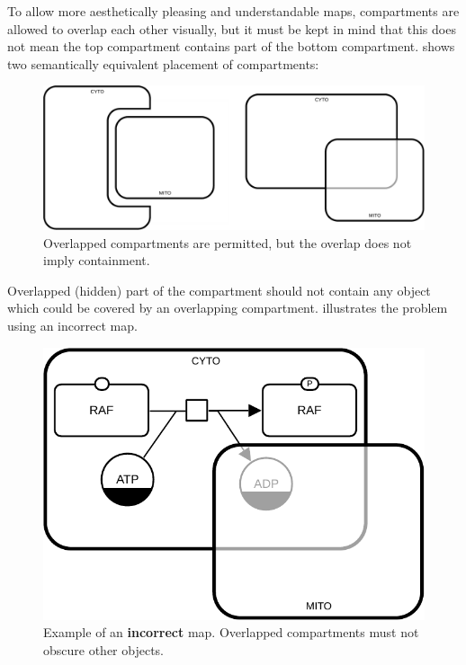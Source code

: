 To allow more aesthetically pleasing and understandable maps, compartments are allowed to overlap each other visually, but it must be kept in mind that this does not mean the top compartment contains part of the bottom compartment.
 shows two semantically equivalent placement of compartments:

\begin{figure}[H]
  \centering
  \includegraphics[scale = 0.5]{images/build/compartment_overlapping_example.pdf}
  \caption{Overlapped compartments are permitted, but the overlap does not imply containment.}
  \label{fig:overlap}
\end{figure}

Overlapped (hidden) part of the compartment should not contain any object which could be covered by an overlapping compartment.
 illustrates the problem using an incorrect map.

\begin{figure}[H]
  \centering
  \includegraphics[scale = 0.8]{images/build/compartment_overlapping_wrong_example.pdf}
  \caption{Example of an \textbf{incorrect} map.  Overlapped compartments must not obscure other objects.}
  \label{fig:overlap-bad}
\end{figure}
